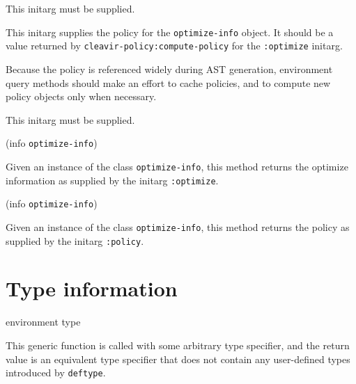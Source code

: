 This initarg must be supplied.


This initarg supplies the policy for the \texttt{optimize-info}
object. It should be a value returned by
\texttt{cleavir-policy:compute-policy} for the \texttt{:optimize} initarg.

Because the policy is referenced widely during AST generation,
environment query methods should make an effort to cache policies,
and to compute new policy objects only when necessary.

This initarg must be supplied.

 {(info {\tt optimize-info})}

Given an instance of the class \texttt{optimize-info}, this method 
returns the optimize information as supplied by the initarg
\texttt{:optimize}.

 {(info {\tt optimize-info})}

Given an instance of the class \texttt{optimize-info}, this method returns the policy as supplied by the initarg \texttt{:policy}.

\section{Type information}

 {environment type}

This generic function is called with some arbitrary type specifier,
and the return value is an equivalent type specifier that does not
contain any user-defined types introduced by \texttt{deftype}. 
